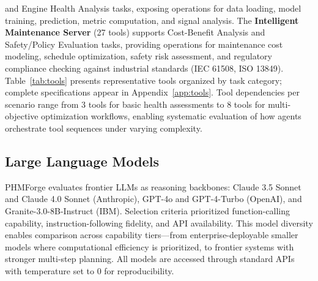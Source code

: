 \documentclass[sigconf]{acmart}
\begin{document}
  and Engine Health Analysis tasks, exposing operations for data loading, model training,  
  prediction, metric computation, and signal analysis. The \textbf{Intelligent Maintenance 
  Server} (27 tools) supports Cost-Benefit Analysis and Safety/Policy Evaluation tasks,    
  providing operations for maintenance cost modeling, schedule optimization, safety risk   
  assessment, and regulatory compliance checking against industrial standards (IEC 61508,  
  ISO 13849). Table~\ref{tab:tools} presents representative tools organized by task        
  category;                                                                                
  complete specifications appear in Appendix~\ref{app:tools}. Tool dependencies per        
  scenario                                                                                 
  range from 3 tools for basic health assessments to 8 tools for multi-objective           
  optimization                                                                             
  workflows, enabling systematic evaluation of how agents orchestrate tool sequences under 
  varying complexity.                                                                      
                                                                                           
\subsection{Large Language Models}         
PHMForge evaluates frontier LLMs as reasoning backbones: Claude 3.5 Sonnet and Claude 4.0 Sonnet (Anthropic), GPT-4o and GPT-4-Turbo (OpenAI), and Granite-3.0-8B-Instruct (IBM).  
Selection criteria prioritized function-calling capability, instruction-following fidelity, and API availability. This model diversity enables comparison across capability tiers---from enterprise-deployable smaller models where computational efficiency is prioritized, to frontier systems with stronger multi-step planning. All models are accessed through standard APIs with temperature set to 0 for reproducibility.    
\end{document}

